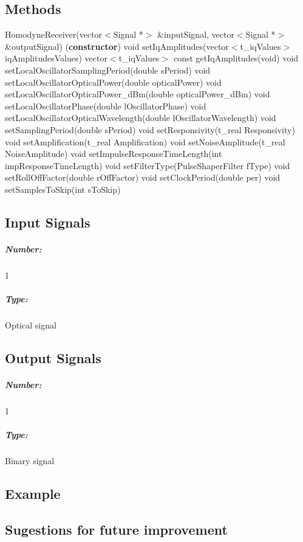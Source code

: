 \pagebreak

\subsection*{Methods}

HomodyneReceiver(vector$<$Signal *$>$ \&inputSignal, vector$<$Signal *$>$ \&outputSignal) (\textbf{constructor})
\bigbreak
void setIqAmplitudes(vector$<$t\_iqValues$>$ iqAmplitudesValues)
\bigbreak
vector$<$t\_iqValues$>$ const getIqAmplitudes(void)
\bigbreak
void setLocalOscillatorSamplingPeriod(double sPeriod)
\bigbreak
void setLocalOscillatorOpticalPower(double opticalPower)
\bigbreak
void setLocalOscillatorOpticalPower\_dBm(double opticalPower\_dBm)
\bigbreak
void setLocalOscillatorPhase(double lOscillatorPhase)
\bigbreak
void setLocalOscillatorOpticalWavelength(double lOscillatorWavelength)
\bigbreak
void setSamplingPeriod(double sPeriod)
\bigbreak
void  setResponsivity(t\_real Responsivity)
\bigbreak
void setAmplification(t\_real Amplification)
\bigbreak
void setNoiseAmplitude(t\_real NoiseAmplitude)
\bigbreak
void setImpulseResponseTimeLength(int impResponseTimeLength)
\bigbreak
void setFilterType(PulseShaperFilter fType)
\bigbreak
void setRollOffFactor(double rOffFactor)
\bigbreak
void setClockPeriod(double per)
\bigbreak
void setSamplesToSkip(int sToSkip)

\pagebreak

\subsection*{Input Signals}

\subparagraph*{Number:} 1

\subparagraph*{Type:} Optical signal

\subsection*{Output Signals}

\subparagraph*{Number:} 1

\subparagraph*{Type:} Binary signal

\subsection*{Example}

\subsection*{Sugestions for future improvement}
